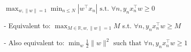 $
\max _{w,\|w\|=1} \min _{n \leq N}\left|w^{\top} x_{n}\right| \text { s.t. } \forall n, y_{n} x_{n}^{\top} w \geq 0
$

- Equivalent to:
$\max _{M \in \mathbb{R}, w,\|w\|=1} M$ s.t. $\forall n, y_{n} x_{n}^{\top} w \geq M$

- Also equivalent to:
$
\min _{w} \frac{1}{2}\|w\|^{2} \text { such that } \forall n, y_{n} x_{n}^{\top} w \geq 1
$









